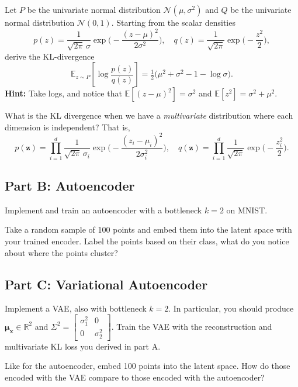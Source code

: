 \documentclass{article}
\begin{document}
Let $P$ be the univariate normal distribution $\mathcal{N}(\mu,\sigma^2)$ and $Q$ be the univariate normal distribution $\mathcal{N}(0,1)$.
Starting from the scalar densities
$$
  p(z)=\frac{1}{\sqrt{2\pi}\,\sigma}\exp\!\Big(-\frac{(z-\mu)^2}{2\sigma^2}\Big),\quad
  q(z)=\frac{1}{\sqrt{2\pi}}\exp\!\Big(-\frac{z^2}{2}\Big),
$$
derive the KL-divergence
$$
  \mathbb{E}_{z\sim P}\left[\log \frac{p(z)}{q(z)}\right]
  =\tfrac12\big(\mu^2+\sigma^2-1-\log\sigma\big).
$$
\textbf{Hint:} Take logs, and notice that $\mathbb{E}[(z-\mu)^2]=\sigma^2$ and $\mathbb{E}[z^2]=\sigma^2+\mu^2$. 

What is the KL divergence when we have a \textit{multivariate} distribution where each dimension is independent? That is,
$$
  p(\mathbf{z})=\prod_{i=1}^d \frac{1}{\sqrt{2\pi}\,\sigma_i}\exp\!\Big(-\frac{(z_i-\mu_i)^2}{2\sigma_i^2}\Big),\quad
  q(\mathbf{z})=\prod_{i=1}^d \frac{1}{\sqrt{2\pi}}\exp\!\Big(-\frac{z_i^2}{2}\Big).
$$

\subsection*{Part B: Autoencoder}

Implement and train an autoencoder with a bottleneck $k=2$ on MNIST.

Take a random sample of 100 points and embed them into the latent space with your trained encoder.
Label the points based on their class, what do you notice about where the points cluster?


\subsection*{Part C: Variational Autoencoder}

Implement a VAE, also with bottleneck $k=2$. In particular, you should produce $\mathbf{\mu_x} \in \mathbb{R}^2$ and $\Sigma^2 = \begin{bmatrix}\sigma_1^2 & 0 \\ 0 & \sigma_2^2\end{bmatrix}$.
Train the VAE with the reconstruction and multivariate KL loss you derived in part A.

Like for the autoencoder, embed 100 points into the latent space.
How do those encoded with the VAE compare to those encoded with the autoencoder?

%
\end{document}

